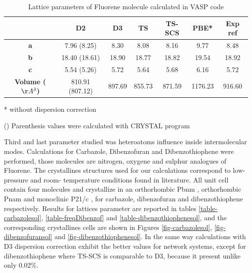  				\begin{table}[H]
 					\caption{Lattice parameters of Fluorene molecule calculated in VASP code}  \label{table-fluorenesol}
 					\begin{center}
 						\begin{threeparttable}
 						\begin{tabular}{c c c c c c c}
 							\toprule
 							& \textbf{D2} & \textbf{D3} & \textbf{TS} & \textbf{TS-SCS} & \textbf{PBE*} & \textbf{Exp} ref\cite{belsky1984fluorene}\\
 							\midrule
 							\textbf{a} & 7.96 (8.25) & 8.30 & 8.08 & 8.16 & 9.77 & 8.48 \\
 							\textbf{b}& 18.40 (18.61) & 18.90 & 18.77 & 18.82 & 19.54 & 18.92\\
 							\textbf{c}& 5.54 (5.26) & 5.72 & 5.64 & 5.68 & 6.16 & 5.72\\
 							\textbf{Volume ($\AA^{3}$)}& 810.91 (807.12) & 897.69 & 855.73 & 871.59 & 1176.23 & 916.60\\
 							\bottomrule
 						\end{tabular}
 						
 						\begin{tablenotes}
 							\item[*] without dispersion correction
 							\item[()] Parenthesis values were calculated with CRYSTAL program
 						\end{tablenotes}
 					\end{threeparttable}
 					\end{center}
 				\end{table}
 				
 				
 	Third and last parameter studied was heteroatoms influence inside intermolecular modes. Calculations for Carbazole, Dibenzofuran and Dibenzothiophene were performed, those molecules are nitrogen, oxygene and sulphur analogues of Fluorene. The crystallines structures used for our calculations correspond to low- pressure and room- temperature conditions found in literature. All unit cell contain four molecules and crystallize in an orthorhombic Pbnm \cite{belskii1985structure}, orthorhombic Pnam \cite{dideberg1972crystal} and monoclinic P21/c \cite{schaffrin1970structure}, for carbazole, dibenzofuran and dibenzothiophene respectively. Results for lattices parameter are reported in tables \ref{table-carbazolesol}, \ref{table-freqDibenzof} and \ref{table-dibenzothiophenesol}, and the corresponding crystallines cells are shown in Figures \ref{fig-carbazolesol}, \ref{fig-dibenzofuransol} and \ref{fig-dibenzothiophenesol}. In the same way calculations with D3 dispersion correction exhibit the better values for network systems, except for dibenzothiophene where TS-SCS is comparable to D3, because it present unlike only 0.02\%.
 	
